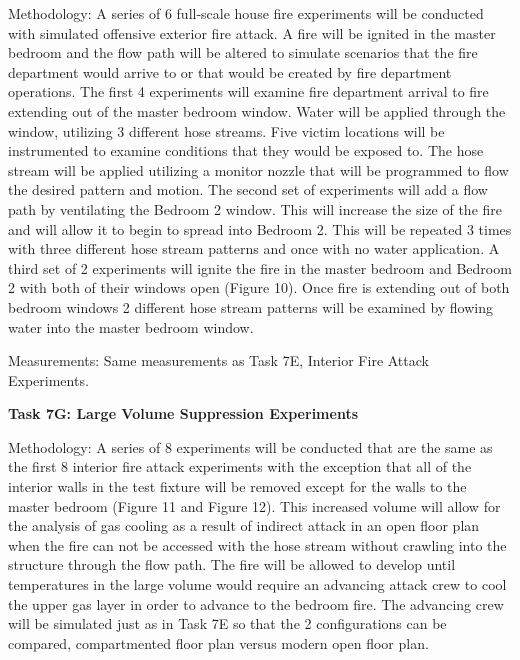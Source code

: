 \documentclass{article}
\begin{document}
\begin{itemize}
Methodology: A series of 6 full-scale house fire experiments will be conducted with simulated offensive exterior fire attack. A fire will be ignited in the master bedroom and the flow path will be altered to simulate scenarios that the fire department would arrive to or that would be created by fire department operations. The first 4 experiments will examine fire department arrival to fire extending out of the master bedroom window. Water will be applied through the window, utilizing 3 different hose streams. Five victim locations will be instrumented to examine conditions that they would be exposed to. The hose stream will be applied utilizing a monitor nozzle that will be programmed to flow the desired pattern and motion. The second set of experiments will add a flow path by ventilating the Bedroom 2 window. This will increase the size of the fire and will allow it to begin to spread into Bedroom 2. This will be repeated 3 times with three different hose stream patterns and once with no water application. A third set of 2 experiments will ignite the fire in the master bedroom and Bedroom 2 with both of their windows open (Figure 10). Once fire is extending out of both bedroom windows 2 different hose stream patterns will be examined by flowing water into the master bedroom window.

Measurements: Same measurements as Task 7E, Interior Fire Attack Experiments.
\vspace*{\baselineskip}

\subitem \bf{Task 7G:  Large Volume Suppression Experiments}
\normalfont
\vspace*{\baselineskip}

Methodology: A series of 8 experiments will be conducted that are the same as the first 8 interior fire attack experiments with the exception that all of the interior walls in the test fixture will be removed except for the walls to the master bedroom (Figure 11 and Figure 12).  This increased volume will allow for the analysis of gas cooling as a result of indirect attack in an open floor plan when the fire can not be accessed with the hose stream without crawling into the structure through the flow path. The fire will be allowed to develop until temperatures in the large volume would require an advancing attack crew to cool the upper gas layer in order to advance to the bedroom fire.  The advancing crew will be simulated just as in Task 7E so that the 2 configurations can be compared, compartmented floor plan versus modern open floor plan.


\end{itemize}
\end{document}
